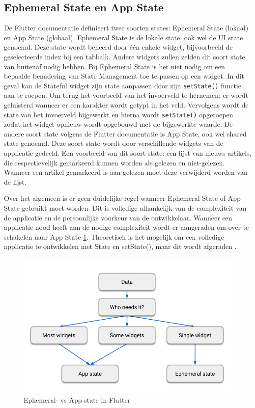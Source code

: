 \subsection{Ephemeral State en App State}
De Flutter documentatie definieert twee soorten states: Ephemeral State (lokaal) en App State (globaal).
Ephemeral State is de lokale state, ook wel de UI state genoemd. Deze state wordt beheerd door één enkele widget, bijvoorbeeld de geselecteerde index bij een tabbalk. Andere widgets zullen zelden dit soort state van buitenaf nodig hebben. Bij Ephemeral State is het niet nodig om een bepaalde benadering van State Management toe te passen op een widget. In dit geval kan de Stateful widget zijn state aanpassen door zijn \verb|setState()| functie aan te roepen.
Om terug het voorbeeld van het invoerveld te hernemen: er wordt geluisterd wanneer er een karakter wordt getypt in het veld. Vervolgens wordt de state van het invoerveld bijgewerkt en hierna wordt \verb|setState()| opgeroepen zodat het widget opnieuw wordt opgebouwd met de bijgewerkte waarde.
\newline
De andere soort state volgens de Flutter documentatie \autocite{Developers2019} is App State, ook wel shared state genoemd. Deze soort state wordt door verschillende widgets van de applicatie gedeeld.
Een voorbeeld van dit soort state: een lijst van nieuws artikels, die respectievelijk gemarkeerd kunnen worden als gelezen en niet-gelezen. Wanneer een artikel gemarkeerd is aan gelezen moet deze verwijderd worden van de lijst. 
\newline

Over het algemeen is er geen duidelijke regel wanneer Ephemeral State of App State gebruikt moet worden. Dit is volledige afhankelijk van de complexiteit van de applicatie en de persoonlijke voorkeur van de ontwikkelaar.
Wanneer een applicatie nood heeft aan de nodige complexiteit wordt er aangeraden om over te schakelen naar App State \ref{fig:ephemeral-vs-app-state-flutter}. Theoretisch is het mogelijk om een volledige applicatie te ontwikkelen met State en setState(), maar dit wordt afgeraden \autocite{Developers2019}.
\begin{figure}[H]
    \includegraphics[width=\linewidth]{img/stand-van-zaken/ephemeral-vs-app-state-flutter.png}
    \caption{Ephemeral- vs App state in Flutter \autocite{Developers2019}}
    \label{fig:ephemeral-vs-app-state-flutter}
\end{figure}

